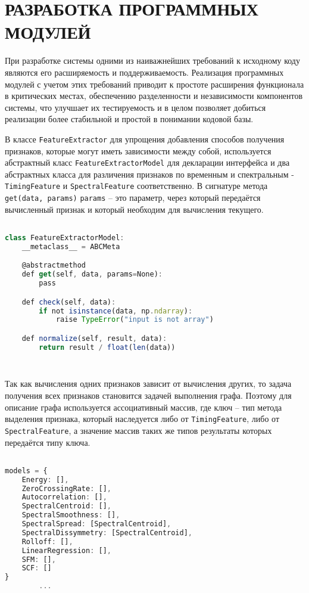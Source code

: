 \section{РАЗРАБОТКА ПРОГРАММНЫХ МОДУЛЕЙ}
\label{sec:dev}

При разработке системы одними из наиважнейших требований к исходному коду являются его расширяемость и поддерживаемость. Реализация программных модулей с учетом этих требований приводит к простоте расширения функционала в критических местах, обеспечению разделенности и независимости компонентов системы, что улучшает их тестируемость и в целом позволяет добиться реализации более стабильной и простой в понимании кодовой базы.

В классе \texttt{FeatureExtractor} для упрощения добавления способов получения признаков, которые могут иметь зависимости между собой, используется абстрактный класс \texttt{FeatureExtractorModel} для декларации интерфейса и два абстрактных класса для различения признаков по временным и спектральным - \texttt{TimingFeature} и \texttt{SpectralFeature} соответственно. В сигнатуре  метода \texttt{get(data, params)}  \texttt{params} -- это параметр, через который передаётся вычисленный признак и который необходим для вычисления текущего.
 
\begin{lstlisting}[language=TypeScript, label=lst:abstract]

class FeatureExtractorModel:
    __metaclass__ = ABCMeta

    @abstractmethod
    def get(self, data, params=None):
        pass

    def check(self, data):
        if not isinstance(data, np.ndarray):
            raise TypeError("input is not array")

    def normalize(self, result, data):
        return result / float(len(data))
       
        
\end{lstlisting}

Так как вычисления одних признаков зависит от вычисления других, то задача получения всех признаков становится задачей выполнения графа. Поэтому для описание графа используется ассоциативный массив, где ключ -- тип метода выделения признака, который наследуется либо от \texttt{TimingFeature}, либо от  \texttt{SpectralFeature}, а значение массив таких же типов результаты которых передаётся типу ключа.

\begin{lstlisting}[language=TypeScript, label=lst:graph]

models = {
    Energy: [],
    ZeroCrossingRate: [],
    Autocorrelation: [],
    SpectralCentroid: [],
    SpectralSmoothness: [],
    SpectralSpread: [SpectralCentroid],
    SpectralDissymmetry: [SpectralCentroid],
    Rolloff: [],
    LinearRegression: [],
    SFM: [],
    SCF: []
}
        ...
\end{lstlisting}

